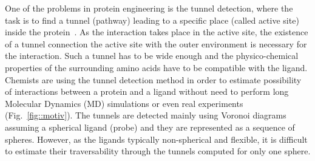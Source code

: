 \documentclass[usletter, 10pt, conference]{ieeeconf} %
\begin{document}
One of the problems in protein engineering is the tunnel detection, where the task is to find a tunnel (pathway) 
leading to a specific place (called active site) inside the protein~\cite{gora2013gates}.
As the interaction takes place in the active site, the existence of a tunnel connection the active site with the outer environment
is necessary for the interaction.
Such a  tunnel has to be wide enough and the physico-chemical properties of the surrounding amino acids have to be compatible with the ligand.
Chemists are using the tunnel detection method in order to estimate possibility of interactions between a protein and a ligand without need to perform long Molecular Dynamics (MD) simulations or even real experiments (Fig.~\ref{fig::motiv}).
The tunnels are detected mainly using Voronoi diagrams~\cite{yaffe2008,caver3} assuming 
a spherical ligand (probe) and they are represented as a sequence of spheres.
However, as the ligands typically non-spherical and flexible,  it is difficult to estimate their traversability through the tunnels computed for only one sphere.
\end{document}
